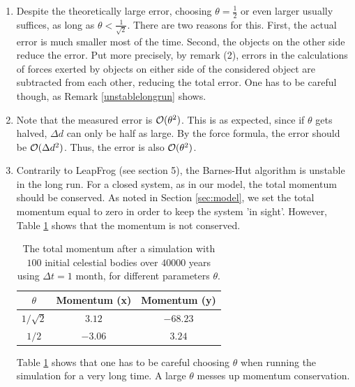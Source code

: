 \begin{enumerate}
\item Despite the theoretically large error, choosing $\theta = \frac{1}{2}$ or even larger usually suffices, as long as $\theta < \frac{1}{\sqrt{2}}$. There are two reasons for this. First, the actual error is much smaller most of the time. Second, the objects on the other side reduce the error. Put more precisely, by remark (2), errors in the calculations of forces exerted by objects on either side of the considered object are subtracted from each other, reducing the total error. One has to be careful though, as Remark \ref{unstablelongrun} shows.
\item Note that the measured error is $\mathcal{O}(\theta^2)$. This is as expected, since if $\theta$ gets halved, $\Delta d$ can only be half as large. By the force formula, the error should be $\mathcal{O}(\Delta d^2)$. Thus, the error is also $\mathcal{O}(\theta^2)$.
\item\label{unstablelongrun} Contrarily to LeapFrog (see section 5), the Barnes-Hut algorithm is unstable in the long run. For a closed system, as in our model, the total momentum should be conserved. As noted in Section \ref{sec:model}, we set the total momentum equal to zero in order to keep the system 'in sight'. However, Table \ref{tab:barneshutmomentum} shows that the momentum is not conserved.
\begin{table}[H]
\centering
\begin{tabular}{c|c|c}
$\theta$ & Momentum (x) & Momentum (y)\\
\hline
$1/\sqrt{2}$ & $3.12$ & $-68.23$\\
$1/2$ & $-3.06$ & $3.24$
\end{tabular}
\caption{The total momentum after a simulation with $100$ initial celestial bodies over $40000$ years using $\Delta t = 1$ month, for different parameters $\theta$.}
\label{tab:barneshutmomentum}
\end{table}
Table \ref{tab:barneshutmomentum} shows that one has to be careful choosing $\theta$ when running the simulation for a very long time. A large $\theta$ messes up momentum conservation.
\end{enumerate}
